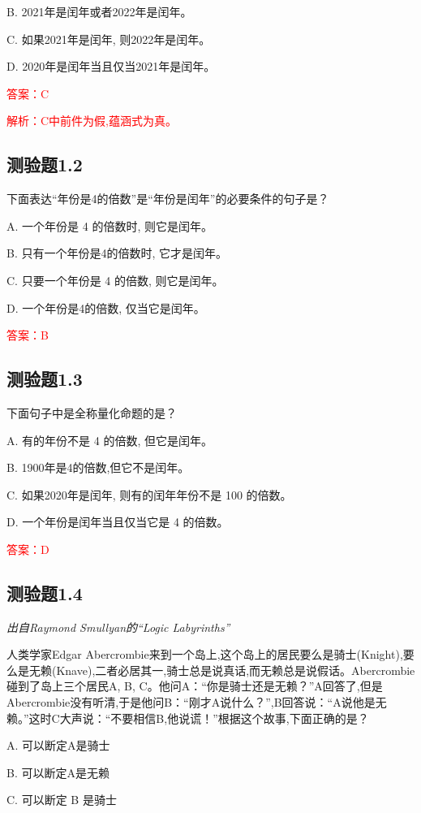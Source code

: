 \documentclass[UTF8, heading=true]{ctexart}
\begin{document}
B. 2021年是闰年或者2022年是闰年。

C. 如果2021年是闰年, 则2022年是闰年。

D. 2020年是闰年当且仅当2021年是闰年。

\textcolor{red}{答案：C}

\textcolor{red}{解析：C中前件为假,蕴涵式为真。}

\subsection{测验题1.2}
下面表达“年份是4的倍数”是“年份是闰年”的必要条件的句子是？

A. 一个年份是 4 的倍数时, 则它是闰年。

B. 只有一个年份是4的倍数时, 它才是闰年。

C. 只要一个年份是 4 的倍数, 则它是闰年。

D. 一个年份是4的倍数, 仅当它是闰年。

\textcolor{red}{答案：B}

\subsection{测验题1.3}

下面句子中是全称量化命题的是？

A. 有的年份不是 4 的倍数, 但它是闰年。

B. 1900年是4的倍数,但它不是闰年。

C. 如果2020年是闰年, 则有的闰年年份不是 100 的倍数。

D. 一个年份是闰年当且仅当它是 4 的倍数。

\textcolor{red}{答案：D}

\subsection{测验题1.4}

\textit{出自Raymond Smullyan的``Logic Labyrinths''}

人类学家Edgar Abercrombie来到一个岛上,这个岛上的居民要么是骑士(Knight),要么是无赖(Knave),二者必居其一,骑士总是说真话,而无赖总是说假话。Abercrombie碰到了岛上三个居民A, B, C。他问A：“你是骑士还是无赖？”A回答了,但是Abercrombie没有听清,于是他问B：“刚才A说什么？”,B回答说：“A说他是无赖。”这时C大声说：“不要相信B,他说谎！”根据这个故事,下面正确的是？

A. 可以断定A是骑士

B. 可以断定A是无赖

C. 可以断定 B 是骑士
\end{document}
